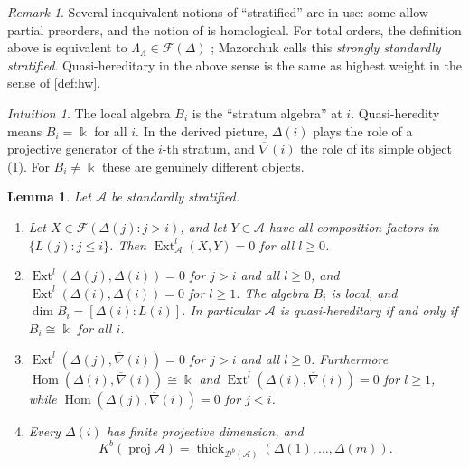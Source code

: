 \documentclass[11pt,reqno]{amsart}
\theoremstyle{plain}
\newtheorem{lemma}[theorem]{Lemma}
\theoremstyle{definition}
\theoremstyle{remark}
\newtheorem{remark}[theorem]{Remark}
\newtheorem*{intuition}{Intuition}
\newcommand{\kk}{\Bbbk}
\DeclareMathOperator{\Hom}{Hom}
\DeclareMathOperator{\Ext}{Ext}
\newcommand{\proj}{\operatorname{proj}}
\newcommand{\Db}{\mathcal{D}^b}
\newcommand{\Kb}{K^b}
\newcommand{\thick}[2][\cD]{\operatorname{thick}_{#1}(#2)}
\newcommand{\nablabar}{\overline{\nabla}}
\newcommand{\cD}{\mathcal{D}}
\newcommand{\cA}{\mathcal{A}}
\newcommand{\cF}{\mathcal{F}}
\begin{document}
\begin{remark}
Several inequivalent notions of ``stratified'' are in use: some allow partial preorders, and the notion of \cite{CPS96} is homological. For total orders, the definition above is equivalent to $\Lambda_\Lambda\in\cF(\Delta)$ \cite{Dla96,AHLU00}; Mazorchuk \cite{Maz04} calls this \emph{strongly standardly stratified}. Quasi-hereditary in the above sense is the same as highest weight in the sense of \cref{def:hw}.
\end{remark}

\begin{intuition}
The local algebra $B_i$ is the ``stratum algebra'' at $i$. Quasi-heredity means $B_i=\kk$ for all $i$. In the derived picture, $\Delta(i)$ plays the role of a projective generator of the $i$-th stratum, and $\nablabar(i)$ the role of its simple object (\cref{lem:strat-basic}). For $B_i\ne\kk$ these are genuinely different objects.
\end{intuition}

\begin{lemma}\label{lem:strat-basic}
Let $\cA$ be standardly stratified.
\begin{enumerate}
\item Let $X\in\cF(\Delta(j):j>i)$, and let $Y\in\cA$ have all composition factors in $\{L(j):j\le i\}$. Then $\Ext^l_\cA(X,Y)=0$ for all $l\ge0$.
\item $\Ext^l(\Delta(j),\Delta(i))=0$ for $j>i$ and all $l\ge0$, and $\Ext^l(\Delta(i),\Delta(i))=0$ for $l\ge1$. The algebra $B_i$ is local, and $\dim B_i=[\Delta(i):L(i)]$. In particular $\cA$ is quasi-hereditary if and only if $B_i\cong\kk$ for all $i$.
\item $\Ext^l(\Delta(j),\nablabar(i))=0$ for $j>i$ and all $l\ge0$. Furthermore $\Hom(\Delta(i),\nablabar(i))\cong\kk$ and $\Ext^l(\Delta(i),\nablabar(i))=0$ for $l\ge1$, while $\Hom(\Delta(j),\nablabar(i))=0$ for $j<i$.
\item Every $\Delta(i)$ has finite projective dimension, and
\[\Kb(\proj\cA)=\thick[\Db(\cA)]{\Delta(1),\dots,\Delta(m)}.\]
\end{enumerate}
\end{lemma}
\end{document}
